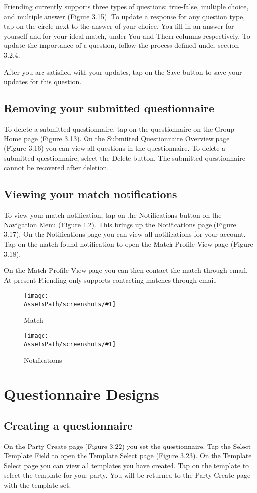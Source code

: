 \documentclass[a4paper,11pt,titlepage]{scrartcl}
\newcommand{\textapp}[1]{{\fontfamily{cmss}\selectfont#1}}
\newcommand{\Friending}{\textapp{Friending}}
\newcommand*{\fileNotifications}{notifications}
\newcommand*{\fileMatch}{match}
\newcommand*{\AssetsPath}{../assets}%
\newcommand{\appscreenshot}[3]{
	\begin{figure}[ht!]%
	\label{#3}%
	\texttt{[image: \\AssetsPath/screenshots/\#1]}%
	\centering%
	\caption{#2}%
	\end{figure}%
}
\begin{document}
\Friending{} currently supports three types of questions: true-false, multiple choice, and multiple answer (Figure 3.15).  To update a response for any question type, tap on the circle next to the answer of your choice.  You fill in an answer for yourself and for your ideal match, under You and Them columns respectively.   To update the importance of a question, follow the process defined under section 3.2.4.

After you are satisfied with your updates, tap on the Save button to save your updates for this question. 

\subsection{Removing your submitted questionnaire}
\label{sec:questionnaire-submitted-delete}
To delete a submitted questionnaire, tap on the questionnaire on the Group Home page (Figure 3.13). On the Submitted Questionnaire Overview page (Figure 3.16) you can view all questions in the questionnaire.  To delete a submitted questionnaire, select the Delete button.  The submitted questionnaire cannot be recovered after deletion.

\subsection{Viewing your match notifications}
\label{sec:questionnaire-matches}

To view your match notification, tap on the Notifications button on the Navigation Menu (Figure 1.2). This brings up the Notifications page (Figure 3.17).  On the Notifications page you can view all notifications for your account.  Tap on the match found notification to open the Match Profile View page (Figure 3.18).  

On the Match Profile View page you can then contact the match through email.  At present \Friending{} only supports contacting matches through email.

\appscreenshot{\fileMatch}{Match}{fig:match}
\appscreenshot{\fileNotifications}{Notifications}{fig:notifications}

\clearpage
\section{Questionnaire Designs}
\label{sec:admin}

\subsection{Creating a questionnaire}
\label{sec:questionnaire-create}
On the Party Create page (Figure 3.22) you set the questionnaire.  Tap the Select Template Field to open the Template Select page (Figure 3.23).  On the Template Select page you can view all templates you have created.  Tap on the template to select the template for your party.  You will be returned to the Party Create page with the template set.
\end{document}
